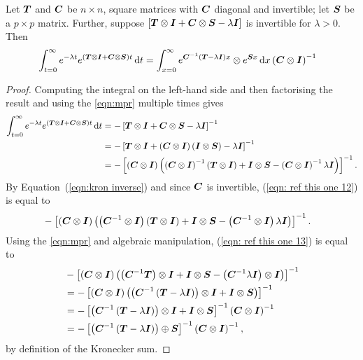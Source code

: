 \begin{lem}\label{lem: lst mpr}
	Let \(\boldsymbol{T}\) and \(\boldsymbol{C}\) be \(n\times n\), square matrices with \(\boldsymbol{C}\) diagonal and invertible; let \(\boldsymbol{S}\) be a \(p\times p\) matrix. Further, suppose \(\left[\boldsymbol{T}\otimes \boldsymbol{I} + \boldsymbol{C}\otimes \boldsymbol{S} - \lambda \boldsymbol{I}\right]\) is invertible for \(\lambda>0\). Then
\begin{align}
	&\int_{t=0}^\infty e^{-\lambda t}  e^{{\left(\boldsymbol{T}\otimes \boldsymbol{I} + \boldsymbol{C}\otimes \boldsymbol{S}\right)t}} \, \mathrm{d} t 
	=   \int_{x=0}^\infty e^{{\boldsymbol{C}^{-1}\left(\boldsymbol{T}-\lambda \boldsymbol{I}\right)x}}\otimes e^{\boldsymbol{S}x} \, \mathrm{d} x \left(\boldsymbol{C}\otimes \boldsymbol{I}\right)^{-1}  \label{eqn:lstsimplify}\end{align}
\end{lem}
\begin{proof}
	Computing the integral on the left-hand side and then factorising the result and using the \ref{eqn:mpr} multiple times gives
	\begin{align}
            	\int_{t=0}^\infty e^{-\lambda t} e^{\left(\boldsymbol{T}\otimes \boldsymbol{I} + \boldsymbol{C}\otimes \boldsymbol{S}\right)t} \, \mathrm{d} t\nonumber 
            	&= - \left[\boldsymbol{T}\otimes \boldsymbol{I} + \boldsymbol{C}\otimes \boldsymbol{S} - \lambda \boldsymbol{I}\right]^{-1}
		\\&= -  \left[\boldsymbol{T}\otimes \boldsymbol{I} + \left(\boldsymbol{C}\otimes \boldsymbol{I}\right)\left(\boldsymbol{I}\otimes \boldsymbol{S}\right) - \lambda \boldsymbol{I}\right]^{-1}
		\\&= -  \left[\left(\boldsymbol{C}\otimes \boldsymbol{I}\right)\left(\left(\boldsymbol{C}\otimes \boldsymbol{I}\right)^{-1}\left(\boldsymbol{T}\otimes \boldsymbol{I} \right)+ \boldsymbol{I}\otimes \boldsymbol{S} - \left(\boldsymbol{C}\otimes \boldsymbol{I}\right)^{-1}\lambda \boldsymbol{I}\right)\right]^{-1}. \label{eqn: ref this one 12}
	\end{align}
	By Equation~(\ref{eqn:kron inverse}) and since \(\boldsymbol{C}\) is invertible, (\ref{eqn: ref this one 12}) is equal to
	\begin{align}
		& - \left[\left(\boldsymbol{C}\otimes \boldsymbol{I}\right)\left(\left(\boldsymbol{C}^{-1}\otimes \boldsymbol{I}\right)\left(\boldsymbol{T}\otimes \boldsymbol{I} \right)+ \boldsymbol{I}\otimes \boldsymbol{S} - \left(\boldsymbol{C}^{-1}\otimes \boldsymbol{I}\right)\lambda \boldsymbol{I}\right)\right]^{-1}. \label{eqn: ref this one 13}
	\end{align}
	{Using the \ref{eqn:mpr} and algebraic manipulation, (\ref{eqn: ref this one 13}) is equal to }
	\begin{align}
		&- \left[\left(\boldsymbol{C}\otimes \boldsymbol{I}\right)\left(\left(\boldsymbol{C}^{-1}\boldsymbol{T}\right)\otimes \boldsymbol{I} + \boldsymbol{I}\otimes \boldsymbol{S} - \left(\boldsymbol{C}^{-1}\lambda \boldsymbol{I}\right)\otimes \boldsymbol{I}\right)\right]^{-1} 
		\\&= - \left[\left(\boldsymbol{C}\otimes \boldsymbol{I}\right)\left(\left(\boldsymbol{C}^{-1}\left(\boldsymbol{T}-\lambda \boldsymbol{I}\right)\right)\otimes \boldsymbol{I} + \boldsymbol{I}\otimes \boldsymbol{S}\right)\right]^{-1} 
		\\&= - \left[\left(\boldsymbol{C}^{-1}\left(\boldsymbol{T}-\lambda \boldsymbol{I}\right)\right)\otimes \boldsymbol{I} + \boldsymbol{I}\otimes \boldsymbol{S}\right]^{-1}\left(\boldsymbol{C}\otimes \boldsymbol{I}\right)^{-1}
		\\&= - \left[\left(\boldsymbol{C}^{-1}\left(\boldsymbol{T}-\lambda \boldsymbol{I}\right)\right)\oplus \boldsymbol{S}\right]^{-1}\left(\boldsymbol{C}\otimes \boldsymbol{I}\right)^{-1},\label{eqn: is an integral}
	\end{align}
	by definition of the Kronecker sum.
	

\end{proof}

